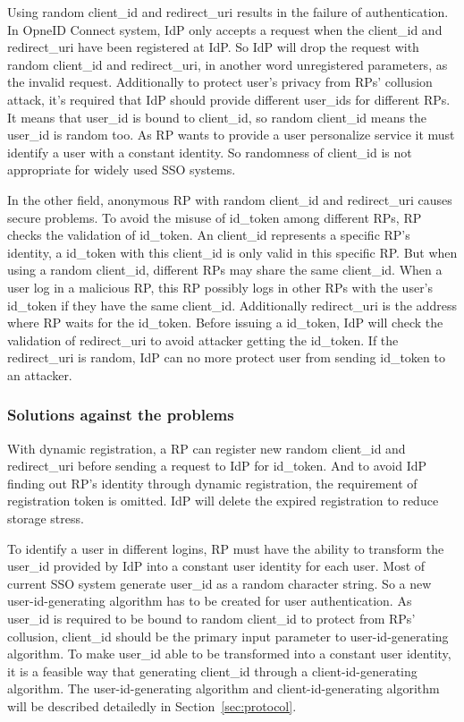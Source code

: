 Using random client\_id and redirect\_uri results in the failure of authentication. In OpneID Connect system, IdP only accepts a request when the client\_id and redirect\_uri have been registered at IdP. So IdP will drop the request with random client\_id and redirect\_uri, in another word unregistered parameters, as the invalid request. Additionally to protect user's privacy from RPs' collusion attack, it's required that IdP should provide different user\_ids for different RPs\cite{OpenIDConnect}. It means that user\_id is bound to client\_id, so random client\_id means the user\_id is random too. As RP wants to provide a user personalize service it must identify a user with a constant identity. So randomness of client\_id is not appropriate for widely used SSO systems.  

In the other field, anonymous RP with random client\_id and redirect\_uri causes secure problems. To avoid the misuse of id\_token among different RPs, RP checks the validation of id\_token. An client\_id represents a specific RP's identity, a id\_token with this client\_id is only valid in this specific RP. But when using a random client\_id, different RPs may share the same client\_id. When a user log in a malicious RP, this RP possibly logs in other RPs with the user's id\_token if they have the same client\_id. Additionally redirect\_uri is the address where RP waits for the id\_token. Before issuing a id\_token, IdP will check the validation of redirect\_uri to avoid attacker getting the id\_token. If the redirect\_uri is random, IdP can no more protect user from sending id\_token to an attacker.
\subsubsection{Solutions against the problems}
With dynamic registration, a RP can register new random client\_id and redirect\_uri before sending a request to IdP for id\_token. And to avoid IdP finding out RP's identity through dynamic registration, the requirement of registration token is omitted. IdP will delete the expired registration to reduce storage stress.

To identify a user in different logins, RP must have the ability to transform the user\_id provided by IdP into a constant user identity for each user. Most of current SSO system generate user\_id as a random  character string. So a new user-id-generating algorithm has to be created for user authentication. As user\_id is required to be bound to random client\_id to protect from RPs' collusion, client\_id should be the primary input parameter to user-id-generating algorithm. To make user\_id able to be transformed into a constant user identity, it is a feasible way that generating client\_id through a client-id-generating algorithm. The user-id-generating algorithm and client-id-generating algorithm will be described detailedly in Section~\ref{sec:protocol}. 

